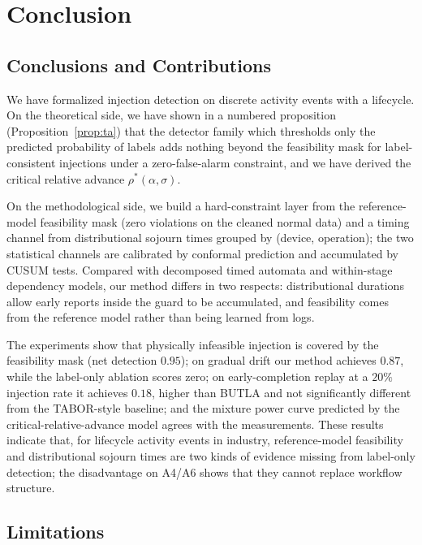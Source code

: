 \documentclass[manuscript,screen,review]{acmart}
\begin{document}
\section{Conclusion}
\label{sec:conclusion}

\subsection{Conclusions and Contributions}
\label{sec:contributions}

We have formalized injection detection on discrete activity events with a lifecycle. On the theoretical side, we have shown in a numbered proposition (Proposition~\ref{prop:ta}) that the detector family which thresholds only the predicted probability of labels adds nothing beyond the feasibility mask for label-consistent injections under a zero-false-alarm constraint, and we have derived the critical relative advance $\rho^*(\alpha,\sigma)$.

On the methodological side, we build a hard-constraint layer from the reference-model feasibility mask (zero violations on the cleaned normal data) and a timing channel from distributional sojourn times grouped by (device, operation); the two statistical channels are calibrated by conformal prediction and accumulated by {CUSUM} tests. Compared with decomposed timed automata and within-stage dependency models, our method differs in two respects: distributional durations allow early reports inside the guard to be accumulated, and feasibility comes from the reference model rather than being learned from logs.

The experiments show that physically infeasible injection is covered by the feasibility mask (net detection $0.95$); on gradual drift our method achieves $0.87$, while the label-only ablation scores zero; on early-completion replay at a $20\%$ injection rate it achieves $0.18$, higher than {BUTLA} and not significantly different from the {TABOR}-style baseline; and the mixture power curve predicted by the critical-relative-advance model agrees with the measurements. These results indicate that, for lifecycle activity events in industry, reference-model feasibility and distributional sojourn times are two kinds of evidence missing from label-only detection; the disadvantage on {A4}/{A6} shows that they cannot replace workflow structure.

\subsection{Limitations}
\label{sec:limitations}
\end{document}
